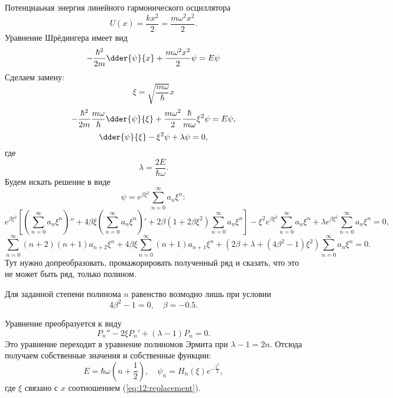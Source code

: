 Потенциаьная энергия линейного гармонического осциллятора
\[
    U(x) = \frac{kx^2}{2} = \frac{m\omega^2x^2}{2}.
\]
Уравнение Шрёдингера имеет вид
\begin{equation}
    -\frac{\hbar^2}{2m}\dder{\psi}{x} + \frac{m\omega^2x^2}{2}\psi = E\psi
    \label{eq:12:schrodinger}
\end{equation}
Сделаем замену:
\begin{equation}
    \xi = \sqrt{\frac{m\omega}{\hbar}}x
    \label{eq:12:replacement}
\end{equation}
\[
    -\frac{\hbar^2}{2m}\frac{m\omega}{\hbar}\dder{\psi}{\xi} +
    \frac{m\omega^2}{2}\frac{\hbar}{m\omega}\xi^2\psi = E\psi,
\]
\begin{equation}
    \dder{\psi}{\xi} - \xi^2\psi + \lambda\psi = 0,
    \label{eq:12}
\end{equation}
где
\[
    \lambda = \frac{2E}{\hbar\omega}.
\]
Будем искать решение в виде
\begin{equation}
    \psi = e^{\beta \xi^2}\sum_{n=0}^{\infty} a_n\xi^n:
    \label{eq:12:solution}
\end{equation}
\[
    e^{\beta\xi^2}\left[ \left(\sum_{n=0}^{\infty} a_n\xi^n\right)''
    + 4\beta\xi\left(\sum_{n=0}^{\infty} a_n\xi^n\right)' +
    2\beta(1+2\beta\xi^2)\sum_{n=0}^{\infty} a_n\xi^n\right] -
    \xi^2e^{\beta \xi^2}\sum_{n=0}^{\infty} a_n\xi^n +
    \lambda e^{\beta \xi^2}\sum_{n=0}^{\infty} a_n\xi^n = 0,
\]
\[
    \sum_{n=0}^{\infty} (n+2)(n+1)a_{n+2}\xi^n
    + 4\beta\xi\sum_{n=0}^{\infty} (n+1)a_{n+1}\xi^n +
    (2\beta+\lambda+(4\beta^2-1)\xi^2)\sum_{n=0}^{\infty} a_n\xi^n = 0.
\]
Тут нужно допреобразовать, промажорировать полученный ряд и сказать, что это не
может быть ряд, только полином.

Для заданной степени полинома \( n \) равенство возмодно лишь при условии
\[
    4\beta^2-1 = 0,\quad \beta = -0.5.
\]

Уравнение преобразуется к виду
\[
    P_n'' - 2\xi P_n' + (\lambda - 1)P_n = 0.
\]
Это уравнение переходит в уравнение полиномов Эрмита при \( \lambda - 1 = 2n \).
Отсюда получаем собственные значения и собственные функции:
\[
    E = \hbar\omega\left( n + \frac{1}{2} \right),\quad
    \psi_n = H_n(\xi)e^{-\frac{\xi^2}{2}},
\]
где \( \xi \) связано с \( x \) соотношением (\ref{eq:12:replacement}).

